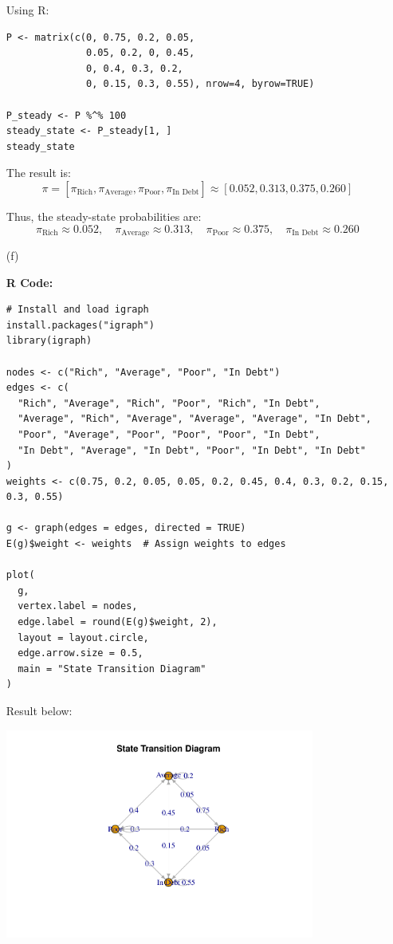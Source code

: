 \documentclass{article}
\begin{document}
\begin{enumerate}
Using R:

\begin{verbatim}
P <- matrix(c(0, 0.75, 0.2, 0.05,
              0.05, 0.2, 0, 0.45,
              0, 0.4, 0.3, 0.2,
              0, 0.15, 0.3, 0.55), nrow=4, byrow=TRUE)

P_steady <- P %^% 100
steady_state <- P_steady[1, ]
steady_state
\end{verbatim}

The result is:
\[
\pi = [\pi_{\text{Rich}}, \pi_{\text{Average}}, \pi_{\text{Poor}}, \pi_{\text{In Debt}}] \approx [0.052, 0.313, 0.375, 0.260]
\]

Thus, the steady-state probabilities are:
\[
\pi_{\text{Rich}} \approx 0.052, \quad \pi_{\text{Average}} \approx 0.313, \quad \pi_{\text{Poor}} \approx 0.375, \quad \pi_{\text{In Debt}} \approx 0.260
\]

\item[(f)]

\textbf{R Code:}

\begin{verbatim}
# Install and load igraph
install.packages("igraph")
library(igraph)

nodes <- c("Rich", "Average", "Poor", "In Debt")
edges <- c(
  "Rich", "Average", "Rich", "Poor", "Rich", "In Debt",
  "Average", "Rich", "Average", "Average", "Average", "In Debt",
  "Poor", "Average", "Poor", "Poor", "Poor", "In Debt",
  "In Debt", "Average", "In Debt", "Poor", "In Debt", "In Debt"
)
weights <- c(0.75, 0.2, 0.05, 0.05, 0.2, 0.45, 0.4, 0.3, 0.2, 0.15, 0.3, 0.55)

g <- graph(edges = edges, directed = TRUE)
E(g)$weight <- weights  # Assign weights to edges

plot(
  g,
  vertex.label = nodes,
  edge.label = round(E(g)$weight, 2),
  layout = layout.circle,
  edge.arrow.size = 0.5,
  main = "State Transition Diagram"
)
\end{verbatim}

Result below: 
\begin{center}
    \includegraphics[width=0.8\textwidth]{HW5_Prob2_Partf.pdf}
\end{center}


\end{enumerate}
\end{document}
